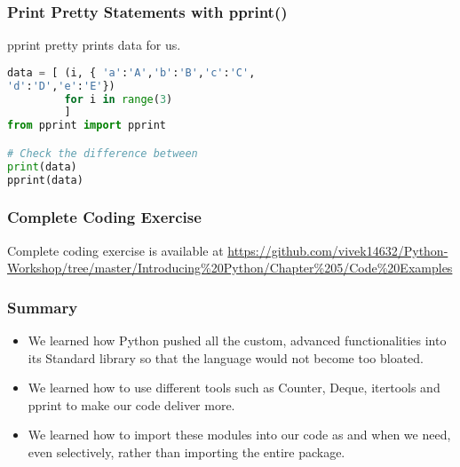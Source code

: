 \documentclass{beamer}
\begin{document}
\begin{frame}[fragile]
\frametitle{Print Pretty Statements with pprint()}
pprint pretty prints data for us.
\begin{lstlisting}[language=Python]
data = [ (i, { 'a':'A','b':'B','c':'C',
'd':'D','e':'E'})
         for i in range(3)
         ]
from pprint import pprint

# Check the difference between 
print(data)
pprint(data)
\end{lstlisting}
\end{frame}

\begin{frame}
\frametitle{Complete Coding Exercise}
Complete coding exercise is available at \url{https://github.com/vivek14632/Python-Workshop/tree/master/Introducing\%20Python/Chapter\%205/Code\%20Examples}
\end{frame}

\begin{frame}
\frametitle{Summary}
\begin{itemize}
\item We learned how Python pushed all the custom, advanced functionalities into its Standard library so that the language would not become too bloated.
\item We learned how to use different tools such as Counter, Deque, itertools and pprint to make our code deliver more.
\item We learned how to import these modules into our code as and when we need, even selectively, rather than importing the entire package.
\end{itemize}
\end{frame}
\end{document}

